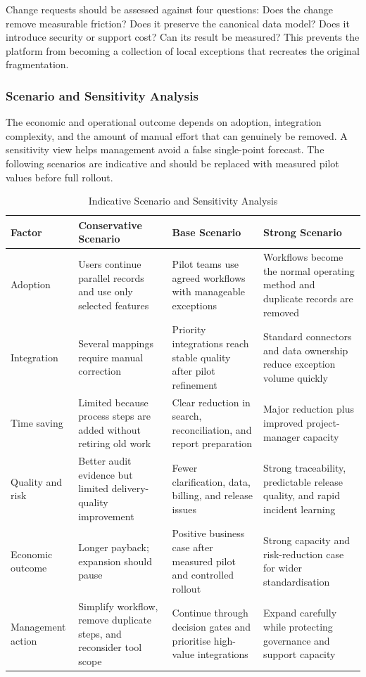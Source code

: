 \documentclass[12pt,a4paper]{report}
\begin{document}
Change requests should be assessed against four questions: Does the change remove measurable
friction? Does it preserve the canonical data model? Does it introduce security or support cost? Can
its result be measured? This prevents the platform from becoming a collection of local exceptions
that recreates the original fragmentation.

\subsubsection{Scenario and Sensitivity Analysis}
\label{sec:sensitivity-analysis}

The economic and operational outcome depends on adoption, integration complexity, and the amount
of manual effort that can genuinely be removed. A sensitivity view helps management avoid a false
single-point forecast. The following scenarios are indicative and should be replaced with measured
pilot values before full rollout.

\begin{table}[H]
\centering
\caption{Indicative Scenario and Sensitivity Analysis}
\label{tab:sensitivity-analysis}
\small
\renewcommand{\arraystretch}{1.18}
\begin{tabularx}{\textwidth}{>{\raggedright\arraybackslash}p{2.5cm}
                                >{\raggedright\arraybackslash}X
                                >{\raggedright\arraybackslash}X
                                >{\raggedright\arraybackslash}X}
\toprule
\textbf{Factor} & \textbf{Conservative Scenario} & \textbf{Base Scenario} & \textbf{Strong Scenario} \\
\midrule
Adoption & Users continue parallel records and use only selected features & Pilot teams use agreed workflows with manageable exceptions & Workflows become the normal operating method and duplicate records are removed \\
Integration & Several mappings require manual correction & Priority integrations reach stable quality after pilot refinement & Standard connectors and data ownership reduce exception volume quickly \\
Time saving & Limited because process steps are added without retiring old work & Clear reduction in search, reconciliation, and report preparation & Major reduction plus improved project-manager capacity \\
Quality and risk & Better audit evidence but limited delivery-quality improvement & Fewer clarification, data, billing, and release issues & Strong traceability, predictable release quality, and rapid incident learning \\
Economic outcome & Longer payback; expansion should pause & Positive business case after measured pilot and controlled rollout & Strong capacity and risk-reduction case for wider standardisation \\
Management action & Simplify workflow, remove duplicate steps, and reconsider tool scope & Continue through decision gates and prioritise high-value integrations & Expand carefully while protecting governance and support capacity \\
\bottomrule
\end{tabularx}
\end{table}
\end{document}
